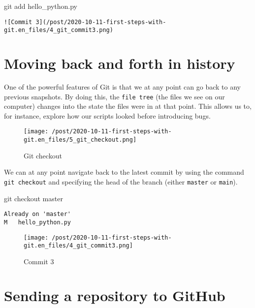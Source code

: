 \documentclass[]{article}
\newenvironment{Shaded}{\begin{snugshade}}{\end{snugshade}}
\newcommand{\FunctionTok}[1]{\textcolor[rgb]{0.00,0.00,0.00}{#1}}
\newcommand{\NormalTok}[1]{#1}
\begin{document}
\begin{Shaded}
\begin{Highlighting}[]
\FunctionTok{git}\NormalTok{ add hello_python.py}
\end{Highlighting}
\end{Shaded}

\begin{verbatim}
![Commit 3](/post/2020-10-11-first-steps-with-git.en_files/4_git_commit3.png)
\end{verbatim}

\hypertarget{moving-back-and-forth-in-history}{%
\section{Moving back and forth in
history}\label{moving-back-and-forth-in-history}}

One of the powerful features of Git is that we at any point can go back
to any previous snapshots. By doing this, the \texttt{file\ tree} (the
files we see on our computer) changes into the state the files were in
at that point. This allows us to, for instance, explore how our scripts
looked before introducing bugs.

\begin{figure}
\centering
\texttt{[image: /post/2020-10-11-first-steps-with-git.en\_files/5\_git\_checkout.png]}
\caption{Git checkout}
\end{figure}

We can at any point navigate back to the latest commit by using the
command \texttt{git\ checkout} and specifying the head of the branch
(either \texttt{master} or \texttt{main}).

\begin{Shaded}
\begin{Highlighting}[]
\FunctionTok{git}\NormalTok{ checkout master}
\end{Highlighting}
\end{Shaded}

\begin{verbatim}
Already on 'master'
M   hello_python.py
\end{verbatim}

\begin{figure}
\centering
\texttt{[image: /post/2020-10-11-first-steps-with-git.en\_files/4\_git\_commit3.png]}
\caption{Commit 3}
\end{figure}

\hypertarget{sending-a-repository-to-github}{%
\section{Sending a repository to
GitHub}\label{sending-a-repository-to-github}}
\end{document}
